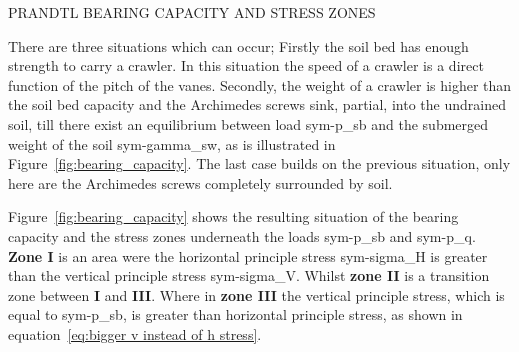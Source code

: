 \begin{RoyalFigure}[!htb, label=fig:bearing_capacity]{PRANDTL BEARING CAPACITY AND STRESS ZONES}
\end{RoyalFigure}

There are three situations which can occur; Firstly the soil bed has enough strength to carry a crawler. In this
situation the speed of a crawler is a direct function of the pitch of the vanes. Secondly, the weight of a crawler is
higher than the soil bed capacity and the Archimedes screws sink, partial, into the undrained soil, till there exist an
equilibrium between load \gls{sym-p_sb} and the submerged weight of the soil \gls{sym-gamma_sw}, as is
illustrated in Figure~\ref{fig:bearing_capacity}. The last case builds on the previous situation, only here are the
Archimedes screws completely surrounded by soil.

Figure~\ref{fig:bearing_capacity} shows the resulting situation of the bearing capacity and the stress zones underneath
the loads \gls{sym-p_sb} and \gls{sym-p_q}. \textbf{Zone I} is an area were the horizontal principle stress
\gls{sym-sigma_H} is greater than the vertical principle stress \gls{sym-sigma_V}. Whilst \textbf{zone II} is a
transition zone between \textbf{I} and \textbf{III}. Where in \textbf{zone III} the vertical principle stress, which is
equal to \gls{sym-p_sb}, is greater than horizontal principle stress, as shown in equation~\ref{eq:bigger v instead of h stress}.

